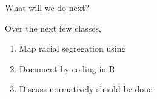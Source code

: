 \documentclass{beamer}
\newcommand\bref[2]{\href{#1}{\color{blue}{#2}}}
\begin{document}
\begin{frame}{What will we do next?}

Over the next few classes,
\begin{enumerate}
\item Map racial segregation using \bref{http://resolver.library.cornell.edu/misc/6268440}{Social Explorer}
\item Document \bref{https://info3370.github.io/sp23/lessonplans/6b/}{racial wealth gaps} by coding in R
\item Discuss normatively should be done
\end{enumerate}

\end{frame}
\end{document}
